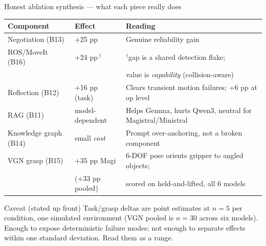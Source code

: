 \documentclass[aspectratio=169,11pt]{beamer}
\begin{document}
\begin{frame}{Honest ablation synthesis --- what each piece really does}
	\begin{table}\footnotesize
		\begin{tabular}{lll}
			\toprule
			\textbf{Component}    & \textbf{Effect}     & \textbf{Reading}                                                  \\
			\midrule
			Negotiation (B13)     & \alert{+25 pp}      & Genuine reliability gain                                          \\
			ROS/MoveIt (B16)      & +24 pp\,$^\dagger$  & $^\dagger$gap is a shared detection flake;                        \\
			                      &                     & \quad value is \emph{capability} (collision-aware)                \\
			Reflection (B12)      & +16 pp (task)       & Clears transient motion failures; +6 pp at op level               \\
			RAG (B11)             & model-dependent     & Helps Gemma, \alert{hurts} Qwen3, neutral for Magistral/Ministral \\
			Knowledge graph (B14) & small \emph{cost}   & Prompt over-anchoring, not a broken component                     \\
			VGN grasp (B15)       & \alert{+35 pp} Magi & 6-DOF pose orients gripper to angled objects;                     \\
			                      & (+33 pp pooled)     & \quad scored on held-and-lifted, all 6 models                     \\
			\bottomrule
		\end{tabular}
	\end{table}
	\vfill
	\begin{alertblock}{Caveat (stated up front)}
		\footnotesize Task/grasp deltas are point estimates at \textbf{$n=5$} per condition,
		one simulated environment (VGN pooled is $n=30$ across six models). Enough to expose
		deterministic failure modes; not enough to separate effects within one standard
		deviation. Read them as a range.
	\end{alertblock}
\end{frame}
\end{document}
